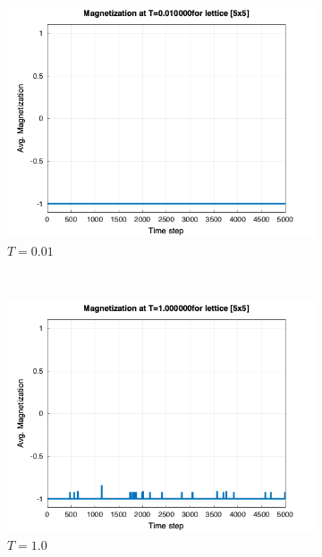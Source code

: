 \begin{figure}[t]
	\centering
	\begin{subfigure}{0.5\textwidth}
		\includegraphics[width=\textwidth]{./img/mag_time_0.010000_5.png}
		\caption{$T=0.01$}
		\label{sfig:p1}
	\end{subfigure}%
	~
	\begin{subfigure}{0.5\textwidth}
		\includegraphics[width=\textwidth]{./img/mag_time_1.000000_5.png}
		\caption{$T=1.0$}
		\label{sfig:p2}
	\end{subfigure}\\
	\begin{subfigure}{0.5\textwidth}

\end{subfigure}
\end{figure}
